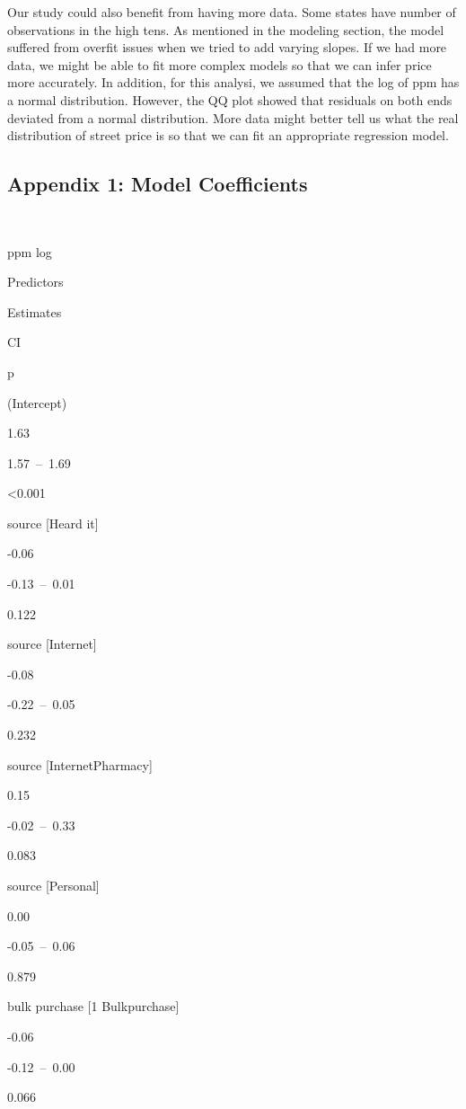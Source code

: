 \documentclass[
]{article}
\begin{document}
Our study could also benefit from having more data. Some states have
number of observations in the high tens. As mentioned in the modeling
section, the model suffered from overfit issues when we tried to add
varying slopes. If we had more data, we might be able to fit more
complex models so that we can infer price more accurately. In addition,
for this analysi, we assumed that the log of ppm has a normal
distribution. However, the QQ plot showed that residuals on both ends
deviated from a normal distribution. More data might better tell us what
the real distribution of street price is so that we can fit an
appropriate regression model.

\newpage

\hypertarget{appendix-1-model-coefficients}{%
\subsection{Appendix 1: Model
Coefficients}\label{appendix-1-model-coefficients}}

~

ppm log

Predictors

Estimates

CI

p

(Intercept)

1.63

1.57~--~1.69

\textless0.001

source {[}Heard it{]}

-0.06

-0.13~--~0.01

0.122

source {[}Internet{]}

-0.08

-0.22~--~0.05

0.232

source {[}InternetPharmacy{]}

0.15

-0.02~--~0.33

0.083

source {[}Personal{]}

0.00

-0.05~--~0.06

0.879

bulk purchase {[}1 Bulkpurchase{]}

-0.06

-0.12~--~0.00

0.066
\end{document}
